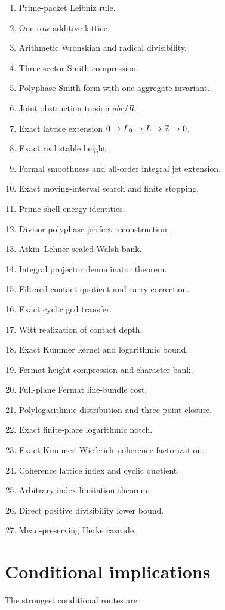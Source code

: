 \begin{enumerate}[leftmargin=1.5em]
\item Prime-packet Leibniz rule.
\item One-row additive lattice.
\item Arithmetic Wronskian and radical divisibility.
\item Three-sector Smith compression.
\item Polyphase Smith form with one aggregate invariant.
\item Joint obstruction torsion $abc/R$.
\item Exact lattice extension $0\to L_0\to L\to\mathbb Z\to0$.
\item Exact real stable height.
\item Formal smoothness and all-order integral jet extension.
\item Exact moving-interval search and finite stopping.
\item Prime-shell energy identities.
\item Divisor-polyphase perfect reconstruction.
\item Atkin--Lehner scaled Walsh bank.
\item Integral projector denominator theorem.
\item Filtered contact quotient and carry correction.
\item Exact cyclic gcd transfer.
\item Witt realization of contact depth.
\item Exact Kummer kernel and logarithmic bound.
\item Fermat height compression and character bank.
\item Full-plane Fermat line-bundle cost.
\item Polylogarithmic distribution and three-point closure.
\item Exact finite-place logarithmic notch.
\item Exact Kummer--Wieferich--coherence factorization.
\item Coherence lattice index and cyclic quotient.
\item Arbitrary-index limitation theorem.
\item Direct positive divisibility lower bound.
\item Mean-preserving Hecke cascade.
\end{enumerate}

\section{Conditional implications}
The strongest conditional routes are:

